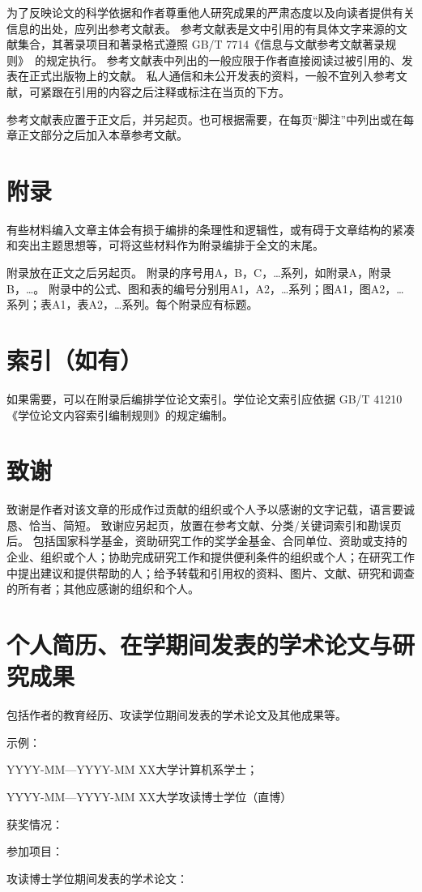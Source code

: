 为了反映论文的科学依据和作者尊重他人研究成果的严肃态度以及向读者提供有关信息的出处，应列出参考文献表。
参考文献表是文中引用的有具体文字来源的文献集合，其著录项目和著录格式遵照 GB/T 7714《信息与文献参考文献著录规则》~\cite{SCSF00045714}的规定执行。
参考文献表中列出的一般应限于作者直接阅读过被引用的、发表在正式出版物上的文献。
私人通信和未公开发表的资料，一般不宜列入参考文献，可紧跟在引用的内容之后注释或标注在当页的下方。

参考文献表应置于正文后，并另起页。也可根据需要，在每页“脚注”中列出或在每章正文部分之后加入本章参考文献。

\section{附录}

有些材料编入文章主体会有损于编排的条理性和逻辑性，或有碍于文章结构的紧凑和突出主题思想等，可将这些材料作为附录编排于全文的末尾。

附录放在正文之后另起页。
附录的序号用A，B，C，…系列，如附录A，附录B，…。
附录中的公式、图和表的编号分别用A1，A2，…系列；图A1，图A2，…系列；表A1，表A2，…系列。每个附录应有标题。

\section{索引（如有）}

如果需要，可以在附录后编排学位论文索引。学位论文索引应依据 GB/T 41210《学位论文内容索引编制规则》的规定编制。

\section{致谢}

致谢是作者对该文章的形成作过贡献的组织或个人予以感谢的文字记载，语言要诚恳、恰当、简短。
致谢应另起页，放置在参考文献、分类/关键词索引和勘误页后。
包括国家科学基金，资助研究工作的奖学金基金、合同单位、资助或支持的企业、组织或个人；协助完成研究工作和提供便利条件的组织或个人；在研究工作中提出建议和提供帮助的人；给予转载和引用权的资料、图片、文献、研究和调查的所有者；其他应感谢的组织和个人。

\section{个人简历、在学期间发表的学术论文与研究成果}

包括作者的教育经历、攻读学位期间发表的学术论文及其他成果等。

\noindent 示例：

{\centering
YYYY-MM—YYYY-MM XX大学计算机系学士；

YYYY-MM—YYYY-MM XX大学攻读博士学位（直博）

获奖情况：

参加项目：

攻读博士学位期间发表的学术论文：

}
